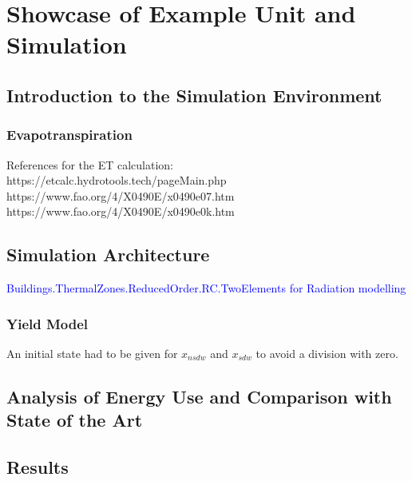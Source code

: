 \chapter{Showcase of Example Unit and Simulation}
\label{chap:simulation}
%
\section{Introduction to the Simulation Environment}
\subsection{Evapotranspiration}
References for the ET calculation:\\
https://etcalc.hydrotools.tech/pageMain.php\\
https://www.fao.org/4/X0490E/x0490e07.htm\\
https://www.fao.org/4/X0490E/x0490e0k.htm\\

\section{Simulation Architecture}
\textcolor{blue}{Buildings.ThermalZones.ReducedOrder.RC.TwoElements for Radiation modelling}
\subsection{Yield Model}
An initial state had to be given for $x_{nsdw}$ and $x_{sdw}$ to avoid a division with zero.
\section{Analysis of Energy Use and Comparison with State of the Art}
\section{Results}
\label{sec:simulation-results}
